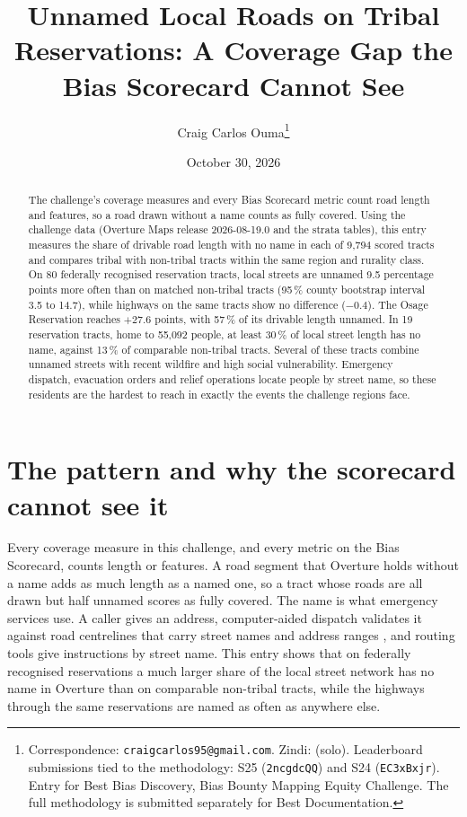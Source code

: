 \documentclass[11pt]{article}
\title{\textbf{Unnamed Local Roads on Tribal Reservations: A Coverage Gap
the Bias Scorecard Cannot See}}
\author[1]{Craig Carlos Ouma\thanks{%
Correspondence: \texttt{craigcarlos95@gmail.com}. Zindi: \zindiuser{} (solo).
Leaderboard submissions tied to the methodology: S25 (\texttt{2ncgdcQQ}) and
S24 (\texttt{EC3xBxjr}).
Entry for Best Bias Discovery, Bias Bounty Mapping Equity Challenge. The
full methodology is submitted separately for Best Documentation.}}
\affil[1]{Independent Researcher}
\date{October 30, 2026}
\begin{document}
\maketitle

\begin{abstract}
\noindent
The challenge's coverage measures and every Bias Scorecard metric count road
length and features, so a road drawn without a name counts as fully covered.
Using the challenge data (Overture Maps release 2026-08-19.0 and the
strata tables), this entry measures the share of drivable road length with no
name in each of 9,794 scored tracts and compares tribal with non-tribal
tracts within the same region and rurality class. On 80 federally recognised
reservation tracts, local streets are unnamed 9.5 percentage points more
often than on matched non-tribal tracts (95\,\% county bootstrap interval 3.5
to 14.7), while highways on the same tracts show no difference ($-0.4$). The
Osage Reservation reaches $+27.6$ points, with 57\,\% of its drivable length
unnamed. In 19 reservation tracts, home to 55,092 people, at least 30\,\% of
local street length has no name, against 13\,\% of comparable non-tribal
tracts. Several of these tracts combine unnamed streets with recent wildfire
and high social vulnerability. Emergency dispatch, evacuation orders and
relief operations locate people by street name, so these residents are the
hardest to reach in exactly the events the challenge regions face.
\end{abstract}


\section{The pattern and why the scorecard cannot see it}

Every coverage measure in this challenge, and every metric on the Bias
Scorecard, counts length or features. A road segment that Overture holds
without a name adds as much length as a named one, so a tract whose roads
are all drawn but half unnamed scores as fully covered. The name is what
emergency services use. A caller gives an address, computer-aided dispatch
validates it against road centrelines that carry street names and address
ranges \cite{nena006}, and routing tools give instructions by street name.
This entry shows that on federally recognised reservations a much larger
share of the local street network has no name in Overture than on comparable
non-tribal tracts, while the highways through the same reservations are
named as often as anywhere else.
\end{document}
